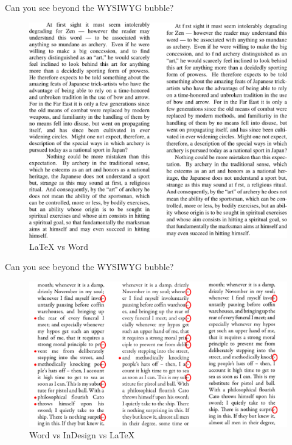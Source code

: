 \documentclass[10pt,times]{beamer}
\begin{document}
\begin{frame}{Can you see beyond the WYSIWYG bubble?}
  \begin{figure}
    \centering
    \includegraphics[height=0.8\textheight]{figs/LaTeX_Word.pdf}
    \caption*{LaTeX vs Word}
\end{figure}
\end{frame}

\begin{frame}{Can you see beyond the WYSIWYG bubble?}
  \begin{figure}
    \centering
    \includegraphics[width=\linewidth]{figs/LaTeX_InDesign_Word.png}
    \caption*{Word vs InDesign vs LaTeX}
\end{figure}
\end{frame}
\end{document}
